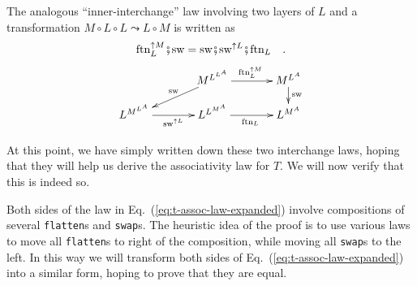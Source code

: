 The analogous ``inner-interchange'' law involving two layers of
$L$ and a transformation $M\circ L\circ L\leadsto L\circ M$ is written
as
\begin{equation}
\text{ftn}_{L}^{\uparrow M}\bef\text{sw}=\text{sw}\bef\text{sw}^{\uparrow L}\bef\text{ftn}_{L}\quad.\label{eq:swap-law-4-L-interchange}
\end{equation}
\[
\xymatrix{\xyScaleY{1pc}\xyScaleX{3pc} & M^{L^{L^{A}}}\ar[r]\sp(0.5){\text{ftn}_{L}^{\uparrow M}}\ar[ld]\sb(0.45){\text{sw}} & M^{L^{A}}\ar[d]\sp(0.4){\text{sw}}\\
L^{M^{L^{A}}}\ar[r]\sb(0.5){\text{sw}^{\uparrow L}} & L^{L^{M^{A}}}\ar[r]\sb(0.5){\text{ftn}_{L}} & L^{M^{A}}
}
\]

At this point, we have simply written down these two interchange laws,
hoping that they will help us derive the associativity law for $T$.
We will now verify that this is indeed so.

Both sides of the law in Eq.~(\ref{eq:t-assoc-law-expanded}) involve
compositions of several \lstinline!flatten!s
and \lstinline!swap!s.
The heuristic idea of the proof is to use various laws to move all
\lstinline!flatten!s to
right of the composition, while moving all \lstinline!swap!s
to the left. In this way we will transform both sides of Eq.~(\ref{eq:t-assoc-law-expanded})
into a similar form, hoping to prove that they are equal.

